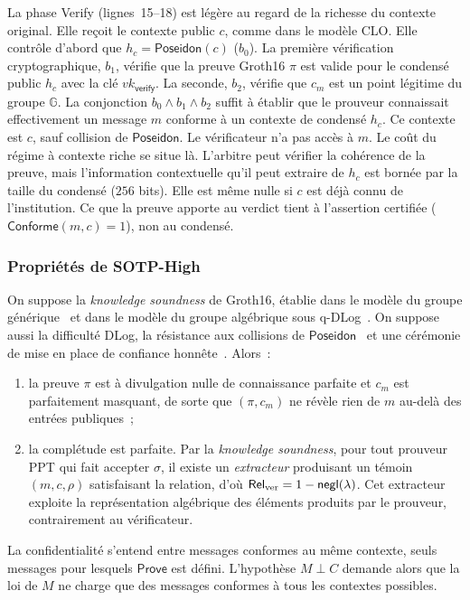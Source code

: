 \begin{sloppypar}
La phase \textsf{Verify} (lignes~15--18) est l\'eg\`ere
au regard de la richesse du contexte original. Elle re\c{c}oit le contexte public $c$, comme
dans le mod\`ele CLO. Elle contr\^ole d'abord que $h_c = \mathsf{Poseidon}(c)$ ($b_0$). La
premi\`ere v\'erification cryptographique, $b_1$, v\'erifie que la
preuve Groth16 $\pi$ est valide pour le condens\'e public $h_c$ avec
la cl\'e $vk_{\mathsf{verify}}$. La seconde, $b_2$, v\'erifie que $c_m$ est un
point l\'egitime du groupe $\mathbb{G}$. La conjonction $b_0 \wedge b_1 \wedge
b_2$ suffit \`a \'etablir que le prouveur connaissait effectivement
un message $m$ conforme \`a un contexte de condens\'e $h_c$. Ce contexte est $c$, sauf collision
de $\mathsf{Poseidon}$. Le v\'erificateur n'a pas acc\`es \`a $m$. Le co\^ut du r\'egime \`a contexte riche se situe
l\`a. L'arbitre peut v\'erifier la coh\'erence de la
preuve, mais l'information contextuelle qu'il peut extraire de $h_c$
est born\'ee par la taille du condens\'e ($256$ bits). Elle est m\^eme nulle si $c$ est
d\'ej\`a connu de l'institution. Ce que la preuve apporte au verdict tient \`a
l'assertion certifi\'ee ($\mathsf{Conforme}(m,c) = 1$), non au condens\'e.

\subsubsection{Propri\'et\'es de SOTP-High}
\label{subsubsec:saturation_high}

\begin{proposition}\label{thm:saturation_sotp_high}
On suppose la \emph{knowledge soundness} de Groth16, \'etablie dans le mod\`ele du groupe
g\'en\'erique~\cite{Groth16} et dans le mod\`ele du groupe alg\'ebrique sous
q-DLog~\cite{FKL18}. On suppose aussi la difficult\'e DLog, la r\'esistance aux collisions de
$\mathsf{Poseidon}$~\cite{Poseidon2019} et une c\'er\'emonie de mise en
place de confiance honn\^ete~\cite{Bowe2017}. Alors~:
\begin{enumerate}
\item la preuve $\pi$ est \`a divulgation nulle de connaissance parfaite et
      $c_m$ est parfaitement masquant, de sorte que $(\pi, c_m)$ ne r\'ev\`ele rien de $m$
      au-del\`a des entr\'ees publiques~;
\item la compl\'etude est parfaite. Par la \emph{knowledge soundness}, pour
      tout prouveur PPT qui fait accepter $\sigma$, il existe un
      \emph{extracteur} produisant un t\'emoin
      $(m, c, \rho)$ satisfaisant la relation, d'o\`u $\mathsf{Rel}_{\mathrm{ver}} = 1 - \mathsf{negl}(\lambda)$.
      Cet extracteur exploite la repr\'esentation alg\'ebrique des \'el\'ements
      produits par le prouveur, contrairement au v\'erificateur.
\end{enumerate}
La confidentialit\'e s'entend entre messages conformes au m\^eme contexte, seuls messages pour
lesquels $\mathsf{Prove}$ est d\'efini. L'hypoth\`ese $M \perp C$ demande alors que la loi de $M$
ne charge que des messages conformes \`a tous les contextes possibles.
\end{proposition}


\end{sloppypar}
